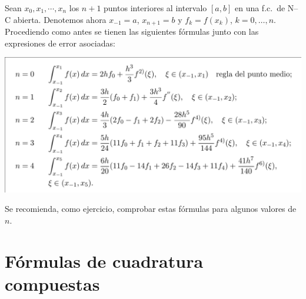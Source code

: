 \begin{example}
  \label{ex:fc-NC-abiertas}
  Sean $x_0,x_1,\cdots,x_n$ los $n+1$ puntos interiores al intervalo
  $[a,b]$ en una f.c.\ de N--C abierta. Denotemos ahora $x_{-1}=a$,
  $x_{n+1}=b$ y $f_k=f(x_k)$, $k=0,\dots,n$. Procediendo como antes
  se tienen las siguientes fórmulas junto con las expresiones de error
  asociadas:
  \begin{center}
    \includegraphics[width=0.95\linewidth]{tema3/formulas-nc-abiertas}
  \end{center}
  Se recomienda, como ejercicio, comprobar estas fórmulas para algunos
  valores de $n$.
\end{example}

\section{Fórmulas de cuadratura compuestas}
\label{sec:fc-compuestas}

